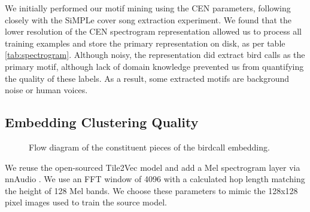 \documentclass[
]{ceurart}
\begin{document}
We initially performed our motif mining using the CEN parameters, following closely with the SiMPLe cover song extraction experiment. We found that the lower resolution of the CEN spectrogram representation allowed us to process all training examples and store the primary representation on disk, as per table \ref{tab:spectrogram}. Although noisy, the representation did extract bird calls as the primary motif, although lack of domain knowledge prevented us from quantifying the quality of these labels. As a result, some extracted motifs are background noise or human voices.

\subsection{Embedding Clustering Quality}

\begin{figure}[hbt!]
\centering
{}
\caption{Flow diagram of the constituent pieces of the birdcall embedding.}
\end{figure}

We reuse the open-sourced Tile2Vec model and add a Mel spectrogram layer via nnAudio \cite{nn-audio}. We use an FFT window of 4096 with a calculated hop length matching the height of 128 Mel bands. We choose these parameters to mimic the 128x128 pixel images used to train the source model.
\end{document}
